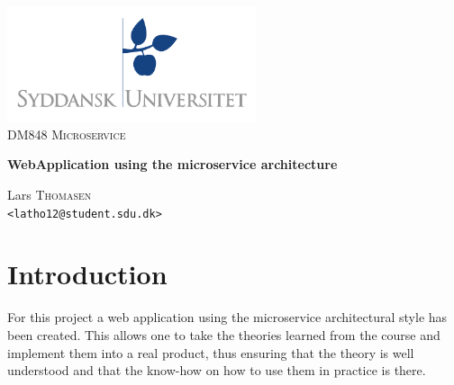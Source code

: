\documentclass[a4paper,11pt,oneside]{book}
\title{}
\author{}
\date{}
\begin{document}
\begin{titlepage}
\begin{center}

\thispagestyle{empty}
\includegraphics[width=0.55\textwidth]{logo.pdf}\\[1cm]    
\textsc{\Large DM848 Microservice}\\[0.5cm]

\begin{Huge}
\textbf{WebApplication using the microservice architecture}
\end{Huge}

\vspace{1cm}

\begin{minipage}{1\textwidth}
\begin{center}


Lars \textsc{Thomasen}\\
\verb!<latho12@student.sdu.dk>!\\

\end{center}
\end{minipage}


\renewcommand{\contentsname}{Table of Contents}
\tableofcontents
\end{center}
\end{titlepage}


\pagestyle{ruled}

%
%
\chapter{Introduction}
\setcounter{section}{1}

For this project a web application using the microservice architectural style has been created. This allows one to take the theories learned from the course and implement them into a real product, thus ensuring that the theory is well understood and that the know-how on how to use them in practice is there.
\end{document}
